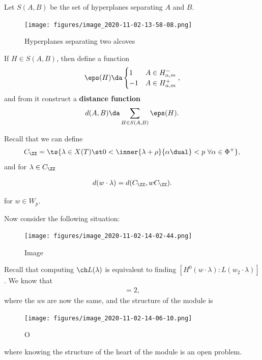 Let \(S(A, B)\) be the set of hyperplanes separating \(A\) and \(B\).

\begin{figure}
\centering
\texttt{[image: figures/image\_2020-11-02-13-58-08.png]}
\caption{Hyperplanes separating two alcoves}
\end{figure}

If \(H\in S(A, B)\), then define a function
\begin{align*}  
\eps(H) \da
\begin{cases}
1 & A\in H_{\alpha, m}^- \\
-1 & A\in H_{\alpha, m}^+
\end{cases}
,\end{align*} and from it construct a \textbf{distance function}
\begin{align*}  
d(A, B) \da \sum_{H\in S(A, B)} \eps(H)
.\end{align*}

Recall that we can define
\begin{align*}  
C_\ZZ = \ts{\lambda \in X(T) \st 0 < \inner{\lambda+\rho}{\alpha\dual}<p \,\, \forall \alpha\in\Phi^+ }
,\end{align*} and for \(\lambda \in C_\ZZ\)

\begin{align*}  
d(w\cdot \lambda) = d(C_\ZZ, wC_\ZZ)
.\end{align*}

for \(w\in W_p\).

Now consider the following situation:

\begin{figure}
\centering
\texttt{[image: figures/image\_2020-11-02-14-02-44.png]}
\caption{Image}
\end{figure}

Recall that computing \(\ch L(\lambda)\) is equivalent to finding
\([H^0(w\cdot \lambda): L(w_2\cdot \lambda)]\). We know that
\begin{align*}  
[T_\mu^\lambda (L(w\cdot\mu)) : L(w\cdot \mu)] = 2
,\end{align*} where the \(w\)s are now the same, and the structure of
the module is

\begin{figure}
\centering
\texttt{[image: figures/image\_2020-11-02-14-06-10.png]}
\caption{O}
\end{figure}

where knowing the structure of the heart of the module is an open
problem.

